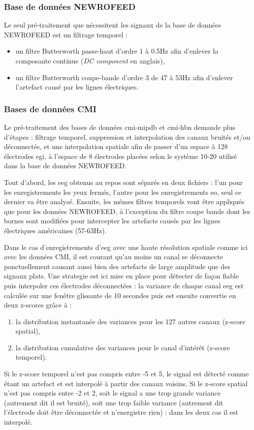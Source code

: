 \subsubsection{Base de données NEWROFEED}
Le seul pré-traitement que nécessitent les signaux de la base de données NEWROFEED est un filtrage temporel : 
\begin{itemize}
\item un filtre Butterworth passe-haut d'ordre 1 à 0.5Hz afin d'enlever la composante continue (\textit{DC component} en anglais),
\item un filtre Butterworth coupe-bande d'ordre 3 de 47 à 53Hz afin d'enlever l'artefact causé par les lignes électriques.
\end{itemize}

\subsubsection{Bases de données CMI}

Le pré-traitement des bases de données \gls{cmi-mipdb} et \gls{cmi-hbn} demande plus d'étapes : filtrage temporel, suppression et 
interpolation des canaux bruités et/ou déconnectés, et une interpolation spatiale afin de passer d'un espace à 128 électrodes \gls{egi},
à l'espace de 8 électrodes placées selon le système 10-20 utilisé dans la base de données NEWROFEED.

Tout d'abord, les \gls{eeg} obtenus au repos sont séparés en deux fichiers : l'un pour les enregistrements les yeux fermés, 
l'autre pour les enregistrements \gls{eo}, seul ce dernier va être analysé. Ensuite, les mêmes filtres temporels vont être appliqués
que pour les données NEWROFEED, à l'exception du filtre coupe bande dont les bornes sont modifiées pour intercepter les artefacts 
causés par les lignes électriques américaines (57-63Hz).

Dans le cas d'enregistrements d'\gls{eeg} avec une haute résolution spatiale comme ici avec les données CMI, 
il est courant qu'au moins un canal se déconnecte ponctuellement causant aussi bien des artefacts de large amplitude que des signaux plats. 
Une strategie est ici mise en place pour détecter de façon fiable puis interpoler ces électrodes déconnectées : la variance de chaque canal 
\gls{eeg} est calculée sur une fenêtre glissante de 10 secondes puis est ensuite convertie en deux z-scores grâce à :
\begin{enumerate}
\item la distribution instantanée des variances pour les 127 autres canaux (z-score spatial),
\item la distribution cumulative des variances pour le canal d'intérêt (z-score temporel).
\end{enumerate}
Si le z-score temporel n'est pas compris entre -5 et 5, le signal est détecté comme étant un artefact et est interpolé à partir des canaux voisins.
Si le z-score spatial n'est pas compris entre -2 et 2, soit le signal a une trop grande variance (autrement dit il est bruité), soit une trop faible
variance (autrement dit l'électrode doit être déconnectée et n'energistre rien) : dans les deux cas il est interpolé.

